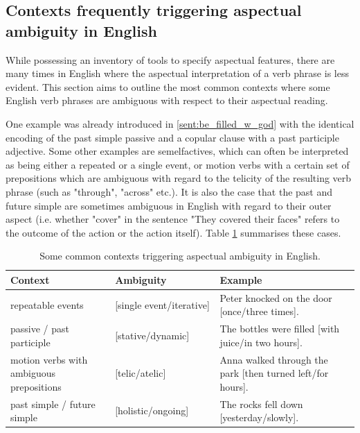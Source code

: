 \subsection{Contexts frequently triggering aspectual ambiguity in English}
While possessing an inventory of tools to specify aspectual features, there are many times in English where the aspectual interpretation of a verb phrase is less evident. This section aims to outline the most common contexts where some English verb phrases are ambiguous with respect to their aspectual reading.

One example was already introduced in \ref{sent:be_filled_w_god} with the identical encoding of the past simple passive and a copular clause with a past participle adjective. Some other examples are semelfactives, which can often be interpreted as being either a repeated or a single event, or motion verbs with a certain set of prepositions which are ambiguous with regard to the telicity of the resulting verb phrase (such as "through", "across" etc.). It is also the case that the past and future simple are sometimes ambiguous in English with regard to their outer aspect (i.e. whether "cover" in the sentence "They covered their faces" refers to the outcome of the action or the action itself). Table \ref{table:asp_amb_contexts_eng} summarises these cases.

\begin{table}[h]
    \centering
    \begin{tabular}{|m{0.3\linewidth} |m{0.3\linewidth}| m{0.4\linewidth}|} \hline
        Context & Ambiguity & Example  \\ \hline \hline
        repeatable events & [single event/iterative] & Peter knocked on the door [once/three times].  \\ \hline
        passive / past participle &  [stative/dynamic] & The bottles were filled [with juice/in two hours]. \\ \hline
        motion verbs with ambiguous prepositions & [telic/atelic] & Anna walked through the park [then turned left/for hours]. \\ \hline
        past simple / future simple & [holistic/ongoing] & The rocks fell down [yesterday/slowly]. \\ \hline
    \end{tabular}
    \caption{Some common contexts triggering aspectual ambiguity in English.}
    \label{table:asp_amb_contexts_eng}
\end{table}

